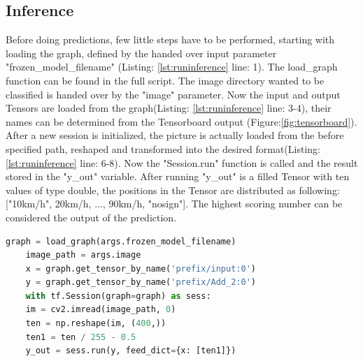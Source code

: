 \subsection{Inference}
Before doing predictions, few little steps have to be performed, starting with loading the graph, defined by the handed over input parameter "frozen\_model\_filename" (Listing: \ref{lst:runinference} line: 1). The load\_graph function can be found in the full script. The image directory wanted to be classified is handed over by the "image" parameter. Now the input and output Tensors are loaded from the graph(Listing: \ref{lst:runinference} line: 3-4), their names can be determined from the Tensorboard output (Figure:\ref{fig:tensorboard}). After a new session is initialized, the picture is actually loaded from the before specified path, reshaped and transformed into the desired format(Listing: \ref{lst:runinference} line: 6-8). Now the "Session.run" function is called and the result stored in the "y\_out" variable. After running "y\_out" is a filled Tensor with ten values of type double, the positions in the Tensor are distributed as following: ["10km/h", 20km/h, ..., 90km/h, "nosign"]. The highest scoring number can be considered the output of the prediction. 

\begin{minipage}{0.95\linewidth}
	
	\begin{lstlisting}[language=python, caption={Simplified excerpt of runinference.py}, label={lst:runinference},captionpos=b]
	graph = load_graph(args.frozen_model_filename)
	image_path = args.image
	x = graph.get_tensor_by_name('prefix/input:0')
	y = graph.get_tensor_by_name('prefix/Add_2:0')
	with tf.Session(graph=graph) as sess:
	im = cv2.imread(image_path, 0)
	ten = np.reshape(im, (400,))
	ten1 = ten / 255 - 0.5    
	y_out = sess.run(y, feed_dict={x: [ten1]})
	\end{lstlisting}
	
\end{minipage}



